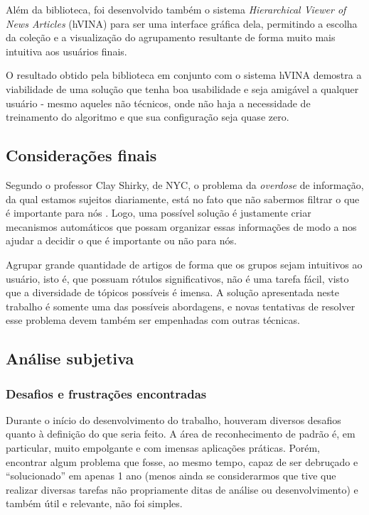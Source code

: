 \documentclass[a4paper,12pt]{article}
\begin{document}
Além da biblioteca, foi desenvolvido também o sistema \textit{Hierarchical Viewer of News Articles} (hVINA) para ser uma interface gráfica dela, permitindo a escolha da coleção e a visualização do agrupamento resultante de forma muito mais intuitiva aos usuários finais.

O resultado obtido pela biblioteca em conjunto com o sistema hVINA demostra a viabilidade de uma solução que tenha boa usabilidade e seja amigável a qualquer usuário - mesmo aqueles não técnicos, onde não haja a necessidade de treinamento do algoritmo e que sua configuração seja quase zero.

\subsection {Considerações finais}
\label {sec:consideracoes_finais}

Segundo o professor Clay Shirky, de NYC, o problema da \textit{overdose} de informação, da qual estamos sujeitos diariamente, está no fato que não sabermos filtrar o que é importante para nós \cite{shirky}. Logo, uma possível solução é justamente criar mecanismos automáticos que possam organizar essas informações de modo a nos ajudar a decidir o que é importante ou não para nós.

Agrupar grande quantidade de artigos de forma que os grupos sejam intuitivos ao usuário, isto é, que possuam rótulos significativos, não é uma tarefa fácil, visto que a diversidade de tópicos possíveis é imensa. A solução apresentada neste trabalho é somente uma das possíveis abordagens, e novas tentativas de resolver esse problema devem também ser empenhadas com outras técnicas.

\subsection {Análise subjetiva}
\label {sec:analise_subjetiva}

\subsubsection {Desafios e frustrações encontradas}
\label {sec:desafios_frustracoes_encontradas}

Durante o início do desenvolvimento do trabalho, houveram diversos desafios quanto à definição do que seria feito. A área de reconhecimento de padrão é, em particular, muito empolgante e com imensas aplicações práticas. Porém, encontrar algum problema que fosse, ao mesmo tempo, capaz de ser debruçado e “solucionado” em apenas 1 ano (menos ainda se considerarmos que tive que realizar diversas tarefas não propriamente ditas de análise ou desenvolvimento) e também útil e relevante, não foi simples.
\end{document}
